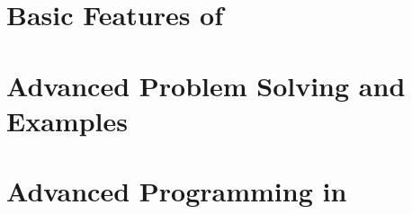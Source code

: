 \documentclass[twoside,a4paper]{book}
\begin{document}
%
%
\clearpage

\tableofcontents
%
%
\setcounter{chapter}{-1}


\part{Basic Features of \Language{}}
%







\begingroup
\let\spaddescriptionsave\description
\def\description{\def\spadfun{\textspadfun}\spaddescriptionsave}

\endgroup

\part{Advanced Problem Solving and Examples}
%



\part{Advanced Programming in \Language{}}
%






%
\appendix


%
%
%
%

%
\printindex
\end{document}

